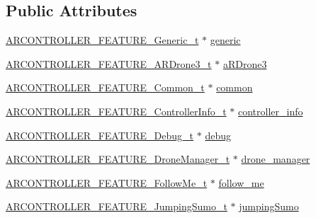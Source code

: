 \subsection*{Public Attributes}
\begin{DoxyCompactItemize}
\item 
\hyperlink{struct_a_r_c_o_n_t_r_o_l_l_e_r___f_e_a_t_u_r_e___generic__t}{A\+R\+C\+O\+N\+T\+R\+O\+L\+L\+E\+R\+\_\+\+F\+E\+A\+T\+U\+R\+E\+\_\+\+Generic\+\_\+t} $\ast$ \hyperlink{struct_a_r_c_o_n_t_r_o_l_l_e_r___device__t_aafc9b5ec4c0779c2909648a00f333fed}{generic}
\item 
\hyperlink{struct_a_r_c_o_n_t_r_o_l_l_e_r___f_e_a_t_u_r_e___a_r_drone3__t}{A\+R\+C\+O\+N\+T\+R\+O\+L\+L\+E\+R\+\_\+\+F\+E\+A\+T\+U\+R\+E\+\_\+\+A\+R\+Drone3\+\_\+t} $\ast$ \hyperlink{struct_a_r_c_o_n_t_r_o_l_l_e_r___device__t_a809af66b49925e9b680960ee0007d440}{a\+R\+Drone3}
\item 
\hyperlink{struct_a_r_c_o_n_t_r_o_l_l_e_r___f_e_a_t_u_r_e___common__t}{A\+R\+C\+O\+N\+T\+R\+O\+L\+L\+E\+R\+\_\+\+F\+E\+A\+T\+U\+R\+E\+\_\+\+Common\+\_\+t} $\ast$ \hyperlink{struct_a_r_c_o_n_t_r_o_l_l_e_r___device__t_a16d6dd91e1863aabb0cde8710d0d3c10}{common}
\item 
\hyperlink{struct_a_r_c_o_n_t_r_o_l_l_e_r___f_e_a_t_u_r_e___controller_info__t}{A\+R\+C\+O\+N\+T\+R\+O\+L\+L\+E\+R\+\_\+\+F\+E\+A\+T\+U\+R\+E\+\_\+\+Controller\+Info\+\_\+t} $\ast$ \hyperlink{struct_a_r_c_o_n_t_r_o_l_l_e_r___device__t_a4449a3343ba0a119185ae6ff77fcd941}{controller\+\_\+info}
\item 
\hyperlink{struct_a_r_c_o_n_t_r_o_l_l_e_r___f_e_a_t_u_r_e___debug__t}{A\+R\+C\+O\+N\+T\+R\+O\+L\+L\+E\+R\+\_\+\+F\+E\+A\+T\+U\+R\+E\+\_\+\+Debug\+\_\+t} $\ast$ \hyperlink{struct_a_r_c_o_n_t_r_o_l_l_e_r___device__t_af760226c07092ebf48bfdfcb40f134ec}{debug}
\item 
\hyperlink{struct_a_r_c_o_n_t_r_o_l_l_e_r___f_e_a_t_u_r_e___drone_manager__t}{A\+R\+C\+O\+N\+T\+R\+O\+L\+L\+E\+R\+\_\+\+F\+E\+A\+T\+U\+R\+E\+\_\+\+Drone\+Manager\+\_\+t} $\ast$ \hyperlink{struct_a_r_c_o_n_t_r_o_l_l_e_r___device__t_a34a46438c1b291723d6cfec87d109e38}{drone\+\_\+manager}
\item 
\hyperlink{struct_a_r_c_o_n_t_r_o_l_l_e_r___f_e_a_t_u_r_e___follow_me__t}{A\+R\+C\+O\+N\+T\+R\+O\+L\+L\+E\+R\+\_\+\+F\+E\+A\+T\+U\+R\+E\+\_\+\+Follow\+Me\+\_\+t} $\ast$ \hyperlink{struct_a_r_c_o_n_t_r_o_l_l_e_r___device__t_adf70c1a463f0f9dbd296106ff4147e28}{follow\+\_\+me}
\item 
\hyperlink{struct_a_r_c_o_n_t_r_o_l_l_e_r___f_e_a_t_u_r_e___jumping_sumo__t}{A\+R\+C\+O\+N\+T\+R\+O\+L\+L\+E\+R\+\_\+\+F\+E\+A\+T\+U\+R\+E\+\_\+\+Jumping\+Sumo\+\_\+t} $\ast$ \hyperlink{struct_a_r_c_o_n_t_r_o_l_l_e_r___device__t_acbbec0fc32ece84d57126411789e98aa}{jumping\+Sumo}

\end{DoxyCompactItemize}
